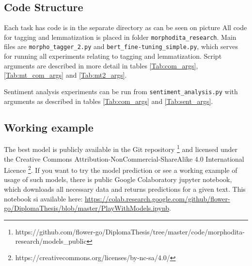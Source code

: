 \subsection{Code Structure}
Each task has code is in the separate directory as can be seen on picture %
All code for tagging and lemmatization is placed in folder \texttt{morphodita\_research}. Main files are \texttt{morpho\_tagger\_2.py} and \texttt{bert\_fine-tuning\_simple.py}, which serves for running all experiments relating to tagging and lemmatization. Script arguments are described in more detail in tables \ref{Tab:com_args}, \ref{Tab:mt_com_args} and \ref{Tab:mt2_args}.
\par
Sentiment analysis experiments can be run from \texttt{sentiment\_analysis.py} with arguments as described in tables \ref{Tab:com_args} and \ref{Tab:sent_args}.

\subsection{Working example}
The best model is publicly available in the Git repository \footnote{https://github.com/flower-go/DiplomaThesis/tree/master/code/morphodita-research/models\_public} %
 and licensed under the Creative Commons Attribution-NonCommercial-ShareAlike 4.0 International Licence \footnote{https://creativecommons.org/licenses/by-nc-sa/4.0/}. If you want to try the model prediction or see a working example of usage of such models, there is public Google Colaboratory \citep{colab} jupyter notebook, which downloads all necessary data and returns predictions for a given text. This notebook si available here: \url{https://colab.research.google.com/github/flower-go/DiplomaThesis/blob/master/PlayWithModels.ipynb}. 


